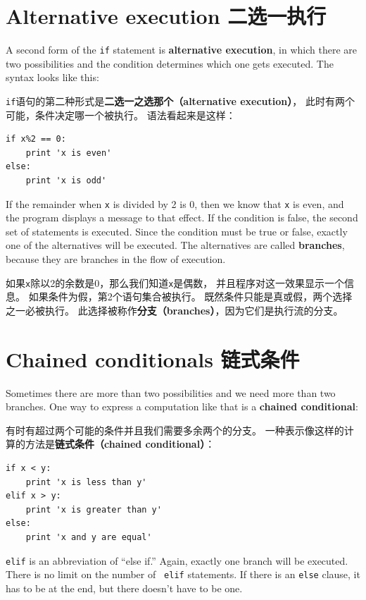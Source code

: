 \documentclass[10pt]{book}
\begin{document}
\begin{CJK}{UTF8}{gbsn}
\section{Alternative execution 二选一执行}
\label{alternative.execution}

A second form of the {\tt if} statement is {\bf alternative execution},
in which there are two possibilities and the condition determines
which one gets executed.  The syntax looks like this:

{\tt if}语句的第二种形式是{\bf 二选一之选那个（alternative execution）}，
此时有两个可能，条件决定哪一个被执行。
语法看起来是这样：

\begin{verbatim}
if x%2 == 0:
    print 'x is even'
else:
    print 'x is odd'
\end{verbatim}
%
If the remainder when {\tt x} is divided by 2 is 0, then we
know that {\tt x} is even, and the program displays a message to that
effect.  If the condition is false, the second set of statements is
executed.  Since the condition must be true or false, exactly one of
the alternatives will be executed.  The alternatives are called
{\bf branches}, because they are branches in the flow of execution.

如果{\tt x}除以2的余数是0，那么我们知道{\tt x}是偶数，
并且程序对这一效果显示一个信息。
如果条件为假，第2个语句集合被执行。
既然条件只能是真或假，两个选择之一必被执行。
此选择被称作{\bf 分支（branches）}，因为它们是执行流的分支。

\section{Chained conditionals 链式条件}

Sometimes there are more than two possibilities and we need more than
two branches.  One way to express a computation like that is a {\bf
chained conditional}:

有时有超过两个可能的条件并且我们需要多余两个的分支。
一种表示像这样的计算的方法是{\bf 链式条件（chained conditional）}：

\begin{verbatim}
if x < y:
    print 'x is less than y'
elif x > y:
    print 'x is greater than y'
else:
    print 'x and y are equal'
\end{verbatim}
%
{\tt elif} is an abbreviation of ``else if.''  Again, exactly one
branch will be executed.  There is no limit on the number of {\tt
elif} statements.  If there is an {\tt else} clause, it has to be
at the end, but there doesn't have to be one.


\end{CJK}
\end{document}
